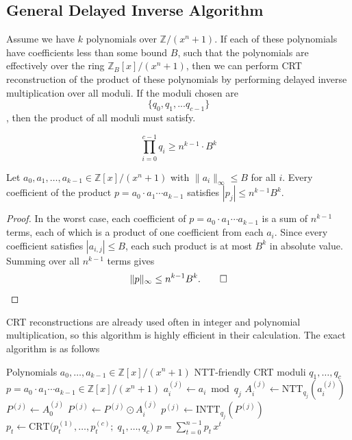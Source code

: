 \documentclass[runningheads]{llncs}
\begin{document}
\subsection{General Delayed Inverse Algorithm}

Assume we have $k$ polynomials over $\mathbb{Z}/(x^n+1)$. If each of these polynomials have coefficients less than some bound $B$, such that the polynomials are effectively over the ring $\mathbb{Z}_B[x]/(x^n+1)$, then we can perform CRT reconstruction of the product of these polynomials by performing delayed inverse multiplication over all moduli. If the moduli chosen are $$ \{q_0, q_1, ... q_{c-1}\}$$, then the product of all moduli must satisfy.

$$\prod_{i=0}^{c-1} q_i \geq n^{k-1} \cdot B^k$$

\begin{proposition}
Let $a_0, a_1, \dots, a_{k-1} \in \mathbb{Z}[x]/(x^n+1)$ with $\|a_i\|_\infty \leq B$ for all $i$. Every coefficient of the product $p = a_0 \cdot a_1 \cdots a_{k-1}$ satisfies $|p_j| \leq n^{k-1} B^k$.
\end{proposition}

\begin{proof}
In the worst case, each coefficient of $p = a_0 \cdot a_1 \cdots a_{k-1}$ is a sum of $n^{k-1}$ terms, each of which is a product of one coefficient from each $a_i$. Since every coefficient satisfies $|a_{i,j}| \leq B$, each such product is at most $B^k$ in absolute value. Summing over all $n^{k-1}$ terms gives
$$\|p\|_\infty \leq n^{k-1} B^k. \qed$$
\end{proof}

CRT reconstructions are already used often in integer and polynomial multiplication, so this algorithm is highly efficient in their calculation. The exact algorithm is as follows

\begin{algorithm}[htbp]
\caption{CRT-Based Delayed Inverse Multiplication}
\begin{algorithmic}[1]
\Require Polynomials $a_0, \dots, a_{k-1} \in \mathbb{Z}[x]/(x^n+1)$
\Require NTT-friendly CRT moduli $q_1, \dots, q_c$
\Ensure $p = a_0 \cdot a_1 \cdots a_{k-1} \in \mathbb{Z}[x]/(x^n+1)$
        \State $a_i^{(j)} \gets a_i \bmod q_j$
        \State $A_i^{(j)} \gets \mathrm{NTT}_{q_j}(a_i^{(j)})$
    \EndFor
    \State $P^{(j)} \gets A_0^{(j)}$
        \State $P^{(j)} \gets P^{(j)} \odot A_i^{(j)}$
    \EndFor
    \State $p^{(j)} \gets \mathrm{INTT}_{q_j}(P^{(j)})$
\EndFor
{}
    \State $p_t \gets \mathrm{CRT}\bigl(p^{(1)}_t, \dots, p^{(c)}_t;\; q_1, \dots, q_c\bigr)$
\EndFor
\State \Return $p = \sum_{t=0}^{n-1} p_t\, x^t$
\end{algorithmic}
\end{algorithm}
\end{document}
